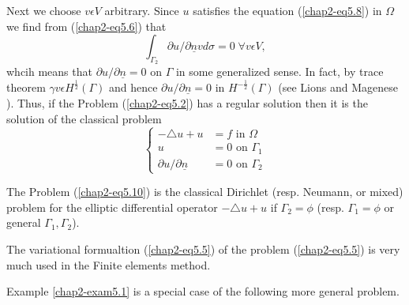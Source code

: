 Next we choose $v \epsilon V$ arbitrary. Since $u$ satisfies the equation (\ref{chap2-eq5.8}) in $\Omega$ we find from (\ref{chap2-eq5.6}) that
\begin{equation*}
\int_{\Gamma_{2}} \partial u / \partial \underline{n} v d \sigma = 0 \; \forall v \epsilon V,\tag{5.9}\label{chap2-eq5.9}
\end{equation*}
whcih means that $\partial u / \partial \underline{n} = 0$ on $\Gamma$ in some generalized sense. In fact, by trace theorem $\gamma v \epsilon H^{\frac{1}{2}}(\Gamma)$ and hence $\partial u / \partial \underline{n} = 0$ in $H^{-\frac{1}{2}} (\Gamma)$ (see Lions and Magenese \cite{key32}). Thus, if the Problem (\ref{chap2-eq5.2}) has a regular solution then it is the solution of the classical problem
\begin{equation*}
\begin{cases}
-\triangle u + u & = f \text{ in } \Omega\\
u & = 0 \text{ on } \Gamma_{1}\\
\partial u / \partial \underline{n} & = 0 \text{ on } \Gamma_{2}\tag{5.10}\label{chap2-eq5.10}
\end{cases}
\end{equation*}

The Problem (\ref{chap2-eq5.10}) is the classical Dirichlet (resp. Neumann, or mixed) problem for the elliptic differential operator $-\triangle u + u$ if $\Gamma_{2} = \phi$ (resp. $\Gamma_{1} = \phi$ or general $\Gamma_{1}, \Gamma_{2}$).

\begin{remark}\label{chap2-rem5.1}
The variational formualtion (\ref{chap2-eq5.5}) of the problem (\ref{chap2-eq5.5}) is very much used in the Finite elements method.
\end{remark}

Example \ref{chap2-exam5.1} is a special case of the following more general problem.


